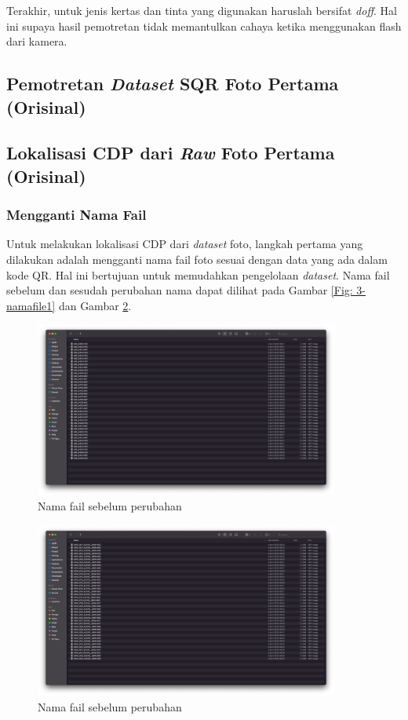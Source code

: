 \noindent Terakhir, untuk jenis kertas dan tinta yang digunakan haruslah bersifat \emph{doff}. Hal ini supaya hasil pemotretan tidak memantulkan cahaya ketika
menggunakan flash dari kamera.

\subsection{Pemotretan \emph{Dataset} SQR Foto Pertama (Orisinal)}

\subsection{Lokalisasi CDP dari \emph{Raw} Foto Pertama (Orisinal)}
\subsubsection{Mengganti Nama Fail}
Untuk melakukan lokalisasi CDP dari \emph{dataset} foto, langkah pertama yang dilakukan adalah mengganti nama fail foto sesuai dengan data yang ada dalam kode
QR. Hal ini bertujuan untuk memudahkan pengelolaan \emph{dataset}. Nama fail sebelum dan sesudah perubahan nama dapat dilihat pada Gambar \ref{Fig:
	3-namafile1} dan Gambar \ref{Fig: 3-namafile2}.

\begin{figure}[h]
	\centering
	\includegraphics[width=10cm]{contents/chapter-3/3-namafile1.png}
	\caption{Nama fail sebelum perubahan}
	\label{Fig: 3-namafile1}
\end{figure}

\begin{figure}[h]
	\centering
	\includegraphics[width=10cm]{contents/chapter-3/3-namafile2.png}
	\caption{Nama fail sebelum perubahan}
	\label{Fig: 3-namafile2}
\end{figure}


